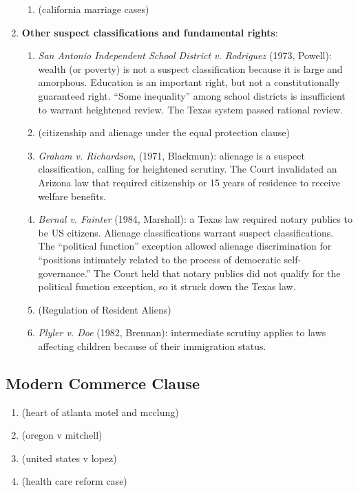 \begin{enumerate}
\begin{enumerate}
        \item (california marriage cases) %
    \end{enumerate}
    \item \textbf{Other suspect classifications and fundamental rights}:
    \begin{enumerate}
        \item \emph{San Antonio Independent School District v. Rodriguez} 
        (1973, Powell): wealth (or poverty) is not a suspect classification 
        because it is large and amorphous. Education is an important right, 
        but not a constitutionally guaranteed right. ``Some inequality'' among 
        school districts is insufficient to warrant heightened review. The 
        Texas system passed rational review. %
        \item (citizenship and alienage under the equal protection clause)
        \item \emph{Graham v. Richardson}, (1971, Blackmun): alienage is a 
        suspect classification, calling for heightened scrutiny. The Court 
        invalidated an Arizona law that required citizenship or 15 years of 
        residence to receive welfare benefits. %
        \item \emph{Bernal v. Fainter} (1984, Marshall): a Texas law required 
        notary publics to be US citizens. Alienage classifications warrant 
        suspect classifications. The ``political function'' exception allowed 
        alienage discrimination for ``positions intimately related to the 
        process of democratic self-governance.'' The Court held that notary 
        publics did not qualify for the political function exception, so it 
        struck down the Texas law. %
        \item (Regulation of Resident Aliens) %
        \item \emph{Plyler v. Doe} (1982, Brennan): intermediate scrutiny 
        applies to laws affecting children because of their immigration 
        status. %
    \end{enumerate}
\end{enumerate}

\subsection{Modern Commerce Clause}

\begin{enumerate}
    \item (heart of atlanta motel and mcclung) %
    \item (oregon v mitchell) %
    \item (united states v lopez) %
    \item (health care reform case) %
\end{enumerate}

